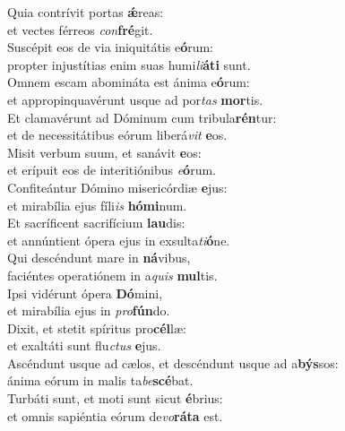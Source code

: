 \evenverse Quia contrívit portas \textbf{ǽ}reas:~\*\\
\evenverse et vectes férreos \textit{con}\textbf{fré}git.\\
\oddverse Suscépit eos de via iniquitátis e\textbf{ó}rum:~\*\\
\oddverse propter injustítias enim suas humi\textit{li}\textbf{á}\textbf{ti} sunt.\\
\evenverse Omnem escam abomináta est ánima e\textbf{ó}rum:~\*\\
\evenverse et appropinquavérunt usque ad por\textit{tas} \textbf{mor}tis.\\
\oddverse Et clamavérunt ad Dóminum cum tribula\textbf{rén}tur:~\*\\
\oddverse et de necessitátibus eórum liberá\textit{vit} \textbf{e}os.\\
\evenverse Misit verbum suum, et sanávit \textbf{e}os:~\*\\
\evenverse et erípuit eos de interitiónibus \textit{e}\textbf{ó}rum.\\
\oddverse Confiteántur Dómino misericórdiæ \textbf{e}jus:~\*\\
\oddverse et mirabília ejus fíli\textit{is} \textbf{hó}\textbf{mi}num.\\
\evenverse Et sacríficent sacrifícium \textbf{lau}dis:~\*\\
\evenverse et annúntient ópera ejus in exsulta\textit{ti}\textbf{ó}ne.\\
\oddverse Qui descéndunt mare in \textbf{ná}vibus,~\*\\
\oddverse faciéntes operatiónem in a\textit{quis} \textbf{mul}tis.\\
\evenverse Ipsi vidérunt ópera \textbf{Dó}mini,~\*\\
\evenverse et mirabília ejus in \textit{pro}\textbf{fún}do.\\
\oddverse Dixit, et stetit spíritus pro\textbf{cél}læ:~\*\\
\oddverse et exaltáti sunt flu\textit{ctus} \textbf{e}jus.\\
\evenverse Ascéndunt usque ad cælos, et descéndunt usque ad a\textbf{býs}sos:~\*\\
\evenverse ánima eórum in malis ta\textit{be}\textbf{scé}bat.\\
\oddverse Turbáti sunt, et moti sunt sicut \textbf{é}brius:~\*\\
\oddverse et omnis sapiéntia eórum de\textit{vo}\textbf{rá}\textbf{ta} est.\\
